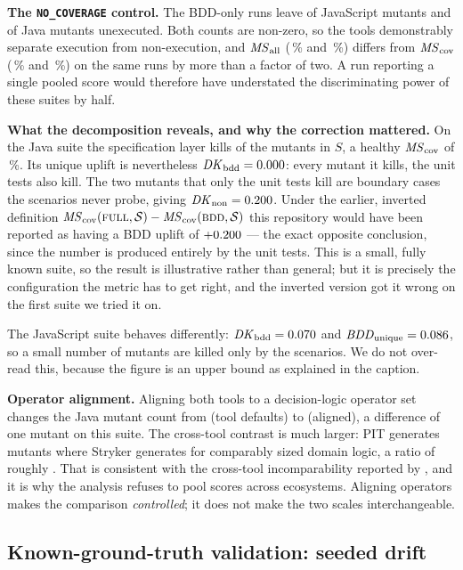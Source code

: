 \textbf{The \texttt{NO\_COVERAGE} control.} The BDD-only runs leave \JsNoCov{} of \JsMutants{}
JavaScript mutants and \JavaNoCov{} of \JavaMutants{} Java mutants unexecuted. Both counts are
non-zero, so the tools demonstrably separate execution from non-execution, and
$\mathit{MS}_{\mathrm{all}}$ (\JsMsAll\,\% and \JavaMsAll\,\%) differs from $\mathit{MS}_{\mathrm{cov}}$ (\JsMsCov\,\% and
\JavaMsCov\,\%) on the same runs by more than a factor of two. A run reporting a single pooled score
would therefore have understated the discriminating power of these suites by half.

\textbf{What the decomposition reveals, and why the correction mattered.} On the Java suite the
specification layer kills \JavaKilled{} of the \JavaS{} mutants in $S$, a healthy $\mathit{MS}_{\mathrm{cov}}$ of
\JavaMsCov\,\%. Its unique uplift is nevertheless $\mathit{DK}_{\mathrm{bdd}} = 0.000$: every mutant it kills, the
unit tests also kill. The two mutants that only the unit tests kill are boundary cases the scenarios
never probe, giving $\mathit{DK}_{\mathrm{non}} = 0.200$. Under the earlier, inverted definition
$\mathit{MS}_{\mathrm{cov}}(\textsc{full},\mathcal{S})-\mathit{MS}_{\mathrm{cov}}(\textsc{bdd},\mathcal{S})$ this repository would have been reported as
having a BDD uplift of $+0.200$ --- the exact opposite conclusion, since the number is produced
entirely by the unit tests. This is a small, fully known suite, so the result is illustrative rather
than general; but it is precisely the configuration the metric has to get right, and the inverted
version got it wrong on the first suite we tried it on.

The JavaScript suite behaves differently: $\mathit{DK}_{\mathrm{bdd}} = 0.070$ and $\mathit{BDD}_{\mathrm{unique}} = 0.086$, so a
small number of mutants are killed only by the scenarios. We do not over-read this, because the
figure is an upper bound as explained in the caption.

\textbf{Operator alignment.} Aligning both tools to a decision-logic operator set changes the Java
mutant count from \JavaDefaultMutants{} (tool defaults) to \JavaMutants{} (aligned), a difference of
one mutant on this suite. The cross-tool contrast is much larger: PIT generates \JavaMutants{}
mutants where Stryker generates \JsMutants{} for comparably sized domain logic, a ratio of roughly
\MutantRatio{}. That is consistent with the cross-tool incomparability reported by
\citet{Kintis2018HowEffectiveTools}, and it is why the analysis refuses to pool scores across
ecosystems. Aligning operators makes the comparison \emph{controlled}; it does not make the two
scales interchangeable.

\subsection{Known-ground-truth validation: seeded drift}\label{sec:seeded}

